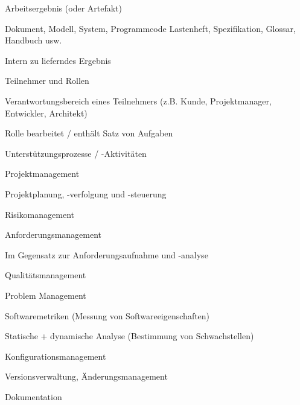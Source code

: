 \documentclass[a4paper]{article}
\begin{document}
\begin{multicols}{3}
  Arbeitsergebnis (oder Artefakt)
  \begin{itemize*}
    \item Dokument, Modell, System, Programmcode Lastenheft, Spezifikation, Glossar, Handbuch usw.
    \item Intern zu lieferndes Ergebnis
  \end{itemize*}

  Teilnehmer und Rollen
  \begin{itemize*}
    \item Verantwortungsbereich eines Teilnehmers (z.B. Kunde, Projektmanager, Entwickler, Architekt)
    \item Rolle bearbeitet / enthält Satz von Aufgaben
  \end{itemize*}

  Unterstützungsprozesse / -Aktivitäten
  \begin{itemize*}
    \item Projektmanagement
    \begin{itemize*}
      \item Projektplanung, -verfolgung und -steuerung
      \item Risikomanagement
    \end{itemize*}
    \item Anforderungsmanagement
    \begin{itemize*}
      \item Im Gegensatz zur Anforderungsaufnahme und -analyse
    \end{itemize*}
    \item Qualitätsmanagement
    \begin{itemize*}
      \item Problem Management
      \item Softwaremetriken (Messung von Softwareeigenschaften)
      \item Statische + dynamische Analyse (Bestimmung von Schwachstellen)
    \end{itemize*}
    \item Konfigurationsmanagement
    \begin{itemize*}
      \item Versionsverwaltung, Änderungsmanagement
    \end{itemize*}
    \item Dokumentation
  \end{itemize*}


\end{multicols}
\end{document}
